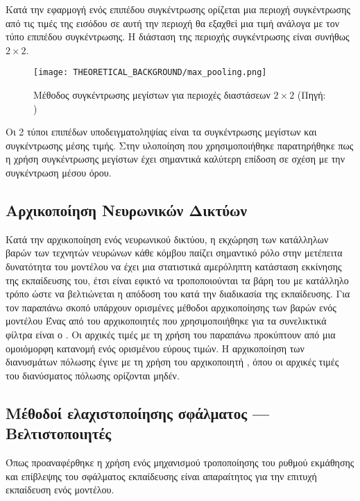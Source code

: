 Κατά την εφαρμογή ενός επιπέδου συγκέντρωσης ορίζεται μια περιοχή συγκέντρωσης από τις τιμές της εισόδου σε αυτή την περιοχή θα εξαχθεί μια τιμή ανάλογα με τον τύπο επιπέδου συγκέντρωσης. Η διάσταση της περιοχής συγκέντρωσης είναι συνήθως $2\times2$. 

\begin{figure}[H]
  \begin{center}
    \texttt{[image: THEORETICAL\_BACKGROUND/max\_pooling.png]}
    \caption{Μέθοδος συγκέντρωσης μεγίστων για περιοχές διαστάσεων $2\times2$ (Πηγή: \href{https://computersciencewiki.org/index.php/Max-pooling_/_Pooling}{})}
  \end{center}
\end{figure}

Οι 2 τύποι επιπέδων υποδειγματοληψίας είναι τα συγκέντρωσης μεγίστων και συγκέντρωσης μέσης τιμής. Στην υλοποίηση που χρησιμοποιήθηκε παρατηρήθηκε πως η χρήση συγκέντρωσης μεγίστων έχει σημαντικά καλύτερη επίδοση σε σχέση με την συγκέντρωση μέσου όρου.

\subsection{Αρχικοποίηση Νευρωνικών Δικτύων}
Κατά την αρχικοποίηση ενός νευρωνικού δικτύου, η εκχώρηση των κατάλληλων βαρών των τεχνητών νευρώνων κάθε κόμβου παίζει σημαντικό ρόλο στην μετέπειτα δυνατότητα του μοντέλου να έχει μια στατιστικά αμερόληπτη κατάσταση εκκίνησης της εκπαίδευσης του, έτσι είναι εφικτό να τροποποιούνται τα βάρη του με κατάλληλο τρόπο ώστε να βελτιώνεται η απόδοση του κατά την διαδικασία της εκπαίδευσης.
Για τον παραπάνω σκοπό υπάρχουν ορισμένες μέθοδοι αρχικοποίησης των βαρών ενός μοντέλου
Ένας από του αρχικοποιητές που χρησιμοποιήθηκε για τα συνελικτικά φίλτρα είναι ο . Οι αρχικές τιμές με τη χρήση του παραπάνω προκύπτουν από μια ομοιόμορφη κατανομή ενός ορισμένου εύρους τιμών. Η αρχικοποίηση των διανυσμάτων πόλωσης έγινε με τη χρήση του αρχικοποιητή
 , όπου οι αρχικές τιμές του διανύσματος πόλωσης ορίζονται μηδέν.

\subsection{Μέθοδοί ελαχιστοποίησης σφάλματος --- Βελτιστοποιητές }
Όπως προαναφέρθηκε η χρήση ενός μηχανισμού τροποποίησης του ρυθμού εκμάθησης και επίβλεψης του σφάλματος εκπαίδευσης είναι απαραίτητος για την επιτυχή εκπαίδευση ενός μοντέλου. 

